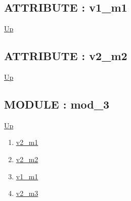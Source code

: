 \subsection*{ATTRIBUTE : v1\_m1}
\hypertarget{ecldoc:intest.in1intest.example_2.mod_2.v1_m1}{}
\par
\begin{minipage}[t]{\textwidth}
\begin{flushleft}
  
\end{flushleft}
\end{minipage}
\hyperlink{ecldoc:intest.in1intest.example_2.mod_2}{Up} \\
\par
\par
\subsection*{ATTRIBUTE : v2\_m2}
\hypertarget{ecldoc:intest.in1intest.example_2.mod_2.v2_m2}{}
\par
\begin{minipage}[t]{\textwidth}
\begin{flushleft}
  
\end{flushleft}
\end{minipage}
\hyperlink{ecldoc:intest.in1intest.example_2.mod_2}{Up} \\
\par
\par

\subsection*{MODULE : mod\_3}
\hypertarget{ecldoc:intest.in1intest.example_2.mod_3}{}
\par
\begin{minipage}[t]{\textwidth}
\begin{flushleft}
  
\end{flushleft}
\end{minipage}
\hyperlink{ecldoc:intest.in1intest.example_2}{Up} \\
\par
\par
\begin{enumerate}
\item \hyperlink{ecldoc:intest.in1intest.example_2.mod_1.v2_m1}{v2\_m1}
\item \hyperlink{ecldoc:intest.in1intest.example_2.mod_2.v2_m2}{v2\_m2}
\item \hyperlink{ecldoc:intest.in1intest.example_2.mod_3.v1_m1}{v1\_m1}
\item \hyperlink{ecldoc:intest.in1intest.example_2.mod_3.v2_m3}{v2\_m3}
\end{enumerate}
